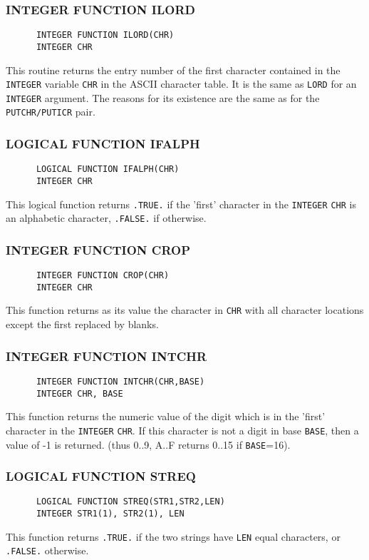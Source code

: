 \subsubsection{\sf INTEGER FUNCTION ILORD}
\begin{verbatim}
      INTEGER FUNCTION ILORD(CHR)
      INTEGER CHR
\end{verbatim}
This routine returns the entry number of the first character 
contained in the {\tt INTEGER} variable {\tt CHR} in the
ASCII character table. It is the same as {\tt LORD} for an
{\tt INTEGER} argument. The reasons for its existence are the same as
for the {\tt PUTCHR/PUTICR} pair.  
\subsubsection{\sf LOGICAL FUNCTION IFALPH}
\begin{verbatim}
      LOGICAL FUNCTION IFALPH(CHR)
      INTEGER CHR
\end{verbatim}
This logical function returns {\tt .TRUE.} if the 
'first' character in the {\tt INTEGER}
{\tt CHR} is an alphabetic character, {\tt .FALSE.} if otherwise.
\subsubsection{\sf INTEGER FUNCTION CROP}
\begin{verbatim}
      INTEGER FUNCTION CROP(CHR)
      INTEGER CHR
\end{verbatim}
This function returns as its value the character in {\tt CHR} with all
character locations except the first replaced by blanks.
\subsubsection{\sf INTEGER FUNCTION INTCHR}
\begin{verbatim}
      INTEGER FUNCTION INTCHR(CHR,BASE)
      INTEGER CHR, BASE
\end{verbatim}
This function returns the numeric value of the digit which is in
the 'first' character in the {\tt INTEGER} {\tt CHR}. 
If this character is not a
digit in base {\tt BASE}, then a value of -1 is returned.
(thus 0..9, A..F returns 0..15 if {\tt BASE}=16).
\subsubsection{\sf LOGICAL FUNCTION STREQ}
\begin{verbatim}
      LOGICAL FUNCTION STREQ(STR1,STR2,LEN)
      INTEGER STR1(1), STR2(1), LEN
\end{verbatim}
This function returns {\tt .TRUE.} if the two strings have {\tt LEN} equal
characters, or {\tt .FALSE.} otherwise.
